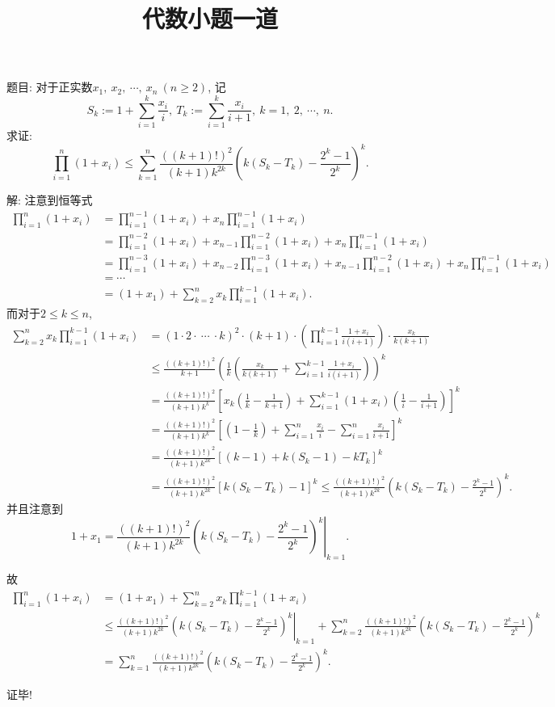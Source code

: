 \documentclass{article}
\title{代数小题一道}
\author{ }
\date{ }
\begin{document}
{\kaishu 题目: 对于正实数$x_1,\ x_2,\ \cdots,\ x_n\ (n\ge 2)$, 记
\[S_k:=1+\sum\limits_{i=1}^{k}{\frac{x_i}{i}},\  T_k:=\sum\limits_{i=1}^{k}\frac{x_i}{i+1},\ k=1,\ 2,\ \cdots,\ n.\]
求证: 
\[\prod\limits_{i=1}^{n}(1+x_i)\le \sum\limits_{k=1}^{n}\frac{((k+1)!)^2}{(k+1) k^{2k}}\left(k(S_k-T_k)-\frac{2^k-1}{2^k}\right)^k.\]
}\par
解: 注意到恒等式
\begin{align*}
	\prod\limits_{i=1}^{n}(1+x_i)&=\prod\limits_{i=1}^{n-1}(1+x_i)+x_n \prod\limits_{i=1}^{n-1}(1+x_i)\\
	&=\prod\limits_{i=1}^{n-2}(1+x_i)+x_{n-1}\prod\limits_{i=1}^{n-2}(1+x_i)+x_n\prod\limits_{i=1}^{n-1}(1+x_i)\\
	&=\prod\limits_{i=1}^{n-3}(1+x_i)+x_{n-2}\prod\limits_{i=1}^{n-3}(1+x_i)+x_{n-1}\prod\limits_{i=1}^{n-2}(1+x_i)+x_n\prod\limits_{i=1}^{n-1}(1+x_i)\\
	&=\cdots\\
	&=(1+x_1)+\sum\limits_{k=2}^{n}{x_k \prod\limits_{i=1}^{k-1}{(1+x_i)}}.
\end{align*}
而对于$2\le k\le n$, 
\begin{align*}
	\sum\limits_{k=2}^{n}{x_k \prod\limits_{i=1}^{k-1}{(1+x_i)}}&=
	(1\cdot 2\cdot\ \cdots\ \cdot k)^2\cdot(k+1)\cdot\left(\prod_{i=1}^{k-1}{\frac{1+x_i}{i(i+1)}}\right)\cdot\frac{x_k}{k(k+1)}\\
	&\le\frac{((k+1)!)^2}{k+1}\left(\frac{1}{k}\left(\frac{x_k}{k(k+1)}+\sum_{i=1}^{k-1}{\frac{1+x_i}{i(i+1)}}\right)\right)^k\\
	&=\frac{((k+1)!)^2}{(k+1)k^k}\left[x_k\left(\frac{1}{k}-\frac{1}{k+1}\right)+\sum_{i=1}^{k-1}{(1+x_i)\left(\frac{1}{i}-\frac{1}{i+1}\right)}\right]^k\\
	&=\frac{((k+1)!)^2}{(k+1)k^k}\left[\left(1-\frac{1}{k}\right)+\sum_{i=1}^{n}\frac{x_i}{i}-\sum_{i=1}^{n}\frac{x_i}{i+1}\right]^k\\
	&=\frac{((k+1)!)^2}{(k+1)k^{2k}}\left[(k-1)+k(S_k-1)-kT_k\right]^k\\
	&=\frac{((k+1)!)^2}{(k+1)k^{2k}}\left[k(S_k-T_k)-1\right]^k
	\le\frac{((k+1)!)^2}{(k+1)k^{2k}}\left(k(S_k-T_k)-\frac{2^k-1}{2^k}\right)^k.
\end{align*}
并且注意到
\[1+x_1=\left.\frac{((k+1)!)^2}{(k+1) k^{2k}}\left(k(S_k-T_k)-\frac{2^k-1}{2^k}\right)^k\right|_{k=1}.\]\par
故
\begin{align*}
	\prod\limits_{i=1}^{n}(1+x_i)&=(1+x_1)+\sum\limits_{k=2}^{n}{x_k \prod\limits_{i=1}^{k-1}{(1+x_i)}}\\
	&\le\left.\frac{((k+1)!)^2}{(k+1) k^{2k}}\left(k(S_k-T_k)-\frac{2^k-1}{2^k}\right)^k\right|_{k=1}+\sum_{k=2}^{n}{\frac{((k+1)!)^2}{(k+1) k^{2k}}\left(k(S_k-T_k)-\frac{2^k-1}{2^k}\right)^k}\\
	&=\sum_{k=1}^{n}{\frac{((k+1)!)^2}{(k+1) k^{2k}}\left(k(S_k-T_k)-\frac{2^k-1}{2^k}\right)^k}.
\end{align*}\par
证毕!
\end{document}
